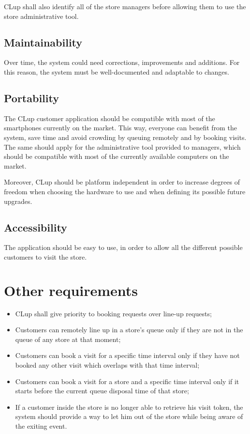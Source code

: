 \documentclass[a4paper,oneside,11pt]{book}   %
\begin{document}
    CLup shall also identify all of the store managers before allowing them to use the store administrative tool.
    
    \subsection{Maintainability}
    Over time, the system could need corrections, improvements and additions. For this reason, the system must be well-documented and adaptable to changes.
    
    \subsection{Portability}
    The CLup customer application should be compatible with most of the smartphones currently on the market. This way, everyone can benefit from the system, save time and avoid crowding by queuing remotely and by booking visits. The same should apply for the administrative tool provided to managers, which should be compatible with most of the currently available computers on the market.\par
    Moreover, CLup should be platform independent in order to increase degrees of freedom when choosing the hardware to use and when defining its possible future upgrades.
    
    \subsection{Accessibility}
    The application should be easy to use, in order to allow all the different possible customers to visit the store.
    
    \section{Other requirements}
    \begin{itemize}
        \item CLup shall give priority to booking requests over line-up requests; \item Customers can remotely line up in a store’s queue only if they are not in the queue of any store at that moment;  
        \item Customers can book a visit for a specific time interval only if they have not booked any other visit which overlaps with that time interval;
        \item Customers can book a visit for a store and a specific time interval only if it starts before the current queue disposal time of that store;
        \item If a customer inside the store is no longer able to retrieve his visit token, the system should provide a way to let him out of the store while being aware of the exiting event.
    \end{itemize}
   
\end{document}
